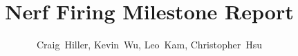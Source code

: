 \documentclass[journal]{IEEEtran}
\begin{document}

%
\title{Nerf Firing Milestone Report}
%
%
%

\author{Craig~Hiller,
Kevin~Wu,
        Leo~Kam, Christopher~Hsu}%

% 
%



%
{}
% 

\maketitle
\end{document}

